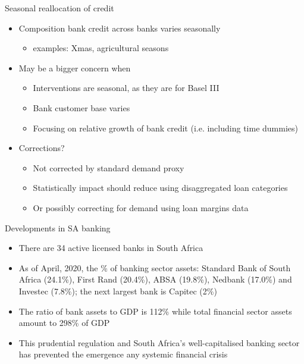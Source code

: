 \documentclass[
  14,
  ignorenonframetext,
  aspectratio=141,
]{beamer}
\providecommand{\tightlist}{%
  \setlength{\itemsep}{0pt}\setlength{\parskip}{0pt}}
\begin{document}
\begin{frame}{Seasonal reallocation of credit}
\protect\hypertarget{seasonal-reallocation-of-credit}{}
\begin{itemize}
\item Composition bank credit across banks varies seasonally  
\begin{itemize}
    \item examples: Xmas, agricultural seasons
\end{itemize}
\item May be a bigger concern when 
\begin{itemize}
    \item Interventions are seasonal, as they are for Basel III 
    \item Bank customer base varies 
    \item Focusing on relative growth of bank credit (i.e. including time dummies)
\end{itemize}
\item Corrections?
\begin{itemize}
    \item Not corrected by standard demand proxy  
    \item Statistically impact should reduce using disaggregated loan categories  
    \item Or possibly correcting for demand using loan margins data
\end{itemize}
\end{itemize}
\end{frame}

\begin{frame}{Developments in SA banking}
\protect\hypertarget{developments-in-sa-banking}{}
\begin{itemize}
\tightlist
\item
  There are 34 active licensed banks in South Africa
\item
  As of April, 2020, the \% of banking sector assets: Standard Bank of
  South Africa (24.1\%), First Rand (20.4\%), ABSA (19.8\%), Nedbank
  (17.0\%) and Investec (7.8\%); the next largest bank is Capitec (2\%)
\item
  The ratio of bank assets to GDP is 112\% while total financial sector
  assets amount to 298\% of GDP
\item
  This prudential regulation and South Africa's well-capitalised banking
  sector has prevented the emergence any systemic financial crisis
\end{itemize}
\end{frame}
\end{document}
